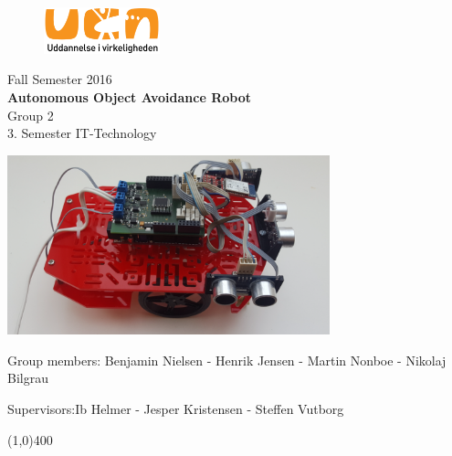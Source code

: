\clearpage
\thispagestyle{empty}

\begin{figure}[H]
	\raggedleft
		\includegraphics[width=0.3\textwidth]{figures/logo-ucn.png}
\end{figure}
\vspace*{\fill} 
\begin{center}
\begin{Huge}
Fall Semester 2016\\
\vspace{5 mm}
\textbf{Autonomous Object Avoidance Robot}\\
\vspace{3 mm}
Group 2\\
\vspace{3 mm}
3. Semester IT-Technology
\end{Huge}
\includegraphics[width=0.7\textwidth]{figures/frontPageBot.png}
\end{center}
\vspace*{\fill}
\begin{center}
Group members:
 Benjamin Nielsen - Henrik Jensen - Martin Nonboe - Nikolaj Bilgrau
\end{center}
\begin{center}
Supervisors:Ib Helmer - Jesper Kristensen - Steffen Vutborg
\end{center}
\begin{center}
\line(1,0){400}
\end{center}